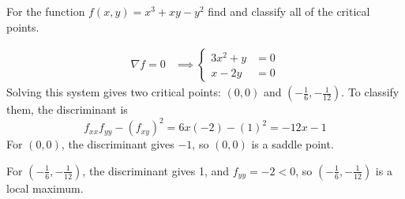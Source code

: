 \documentclass[12pt,answers]{exam}
\begin{document}
\begin{questions}
	\newpage
	\question[14]
	For the function $f(x,y) = x^3 + xy - y^2$ find and classify all of the critical points.
	\begin{solution}
		\begin{align*}
			\nabla f = 0
			&\implies
			\left\{
				\begin{aligned}
					3x^2 + y &= 0\\ 
					x - 2y &= 0
				\end{aligned}
			\right.
		\end{align*}
		Solving this system gives two critical points: 
		$(0,0)$ and $(-\frac1{6}, -\frac1{12})$.
		To classify them, the discriminant is
		\[
			f_{xx} f_{yy} - (f_{xy})^2 
			= 6x(-2) - (1)^2 = -12x - 1
		\]
		For $(0,0)$, the discriminant gives $-1$, so $(0,0)$ is a saddle point.

		For $(-\frac16, -\frac1{12})$, the discriminant gives 1, and $f_{yy} = -2 < 0$, so $(-\frac16, -\frac1{12})$ is a local maximum.
	\end{solution}


\end{questions}
\end{document}
